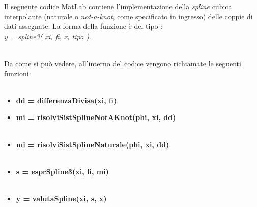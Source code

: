 Il seguente codice MatLab contiene l'implementazione della \textit{spline} cubica interpolante (naturale o \textit{not-a-knot}, come specificato in ingresso) delle coppie di dati assegnate. La forma della funzione è del tipo :\\ \textit{y = spline3( xi, fi, x, tipo )}.\\\
	
Da come si può vedere, all'interno del codice vengono richiamate le seguenti funzioni:\\\ 
	\begin{itemize}
		\item \textbf{dd = differenzaDivisa(xi, fi)}
			
		\item \textbf{mi = risolviSistSplineNotAKnot(phi, xi, dd)}\\\
			
		\item \textbf{mi = risolviSistSplineNaturale(phi, xi, dd)}\\\
			
		\item \textbf{s = esprSpline3(xi, fi, mi)}\\\
			
		\item \textbf{y = valutaSpline(xi, s, x)}\\\
			
	\end{itemize}
	
